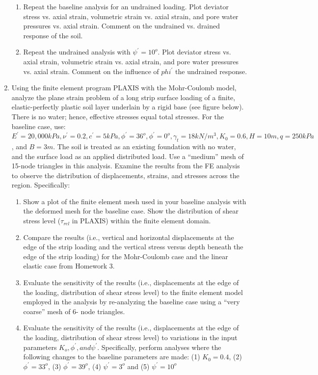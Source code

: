 \documentclass[a4paper,12pt]{article}
\begin{document}
\begin{enumerate}
\begin{enumerate}
		\item Repeat the baseline analysis for an undrained loading. Plot deviator stress vs. axial strain, volumetric strain vs. axial strain, and pore water pressures vs. axial strain. Comment on the undrained vs. drained response of the soil.
		\item Repeat the undrained analysis with $\psi^\prime = 10^o$. Plot deviator stress vs. axial strain,
		volumetric strain vs. axial strain, and pore water pressures vs. axial strain. Comment
		on the influence of $phi^\prime$ the undrained response.
	\end{enumerate}
	
	\item Using the finite element program PLAXIS with the Mohr-Coulomb model, analyze the plane
	strain problem of a long strip surface loading of a finite, elastic-perfectly plastic soil layer
	underlain by a rigid base (see figure below). There is no water; hence, effective stresses
	equal total stresses. For the baseline case, use: $E^\prime = 20,000 kPa, \nu^\prime = 0.2, c^\prime = 5 kPa, \phi^\prime = 36^o, \phi^\prime = 0^o, \gamma_t = 18 kN/m^3, K_0 = 0.6, H = 10m, q = 250 kPa$, and $B = 3 m$.  The soil is treated as an
	existing foundation with no water, and the surface load as an applied distributed load. Use a
	``medium'' mesh of 15-node triangles in this analysis. Examine the results from the FE
	analysis to observe the distribution of displacements, strains, and stresses across the region.	Specifically:
	
	\begin{enumerate}
		\item Show a plot of the finite element mesh used in your baseline analysis with the deformed mesh for the baseline case. Show the
		distribution of shear stress level ($\tau_{rel}$ in PLAXIS) within the finite element domain.
		\item Compare the results (i.e., vertical and horizontal displacements at the edge of the
		strip loading and the vertical stress versus depth beneath the edge of the strip
		loading) for the Mohr-Coulomb case and the linear elastic case from Homework 3.
		\item Evaluate the sensitivity of the results (i.e., displacements at the edge of the
		loading, distribution of shear stress level) to the finite element model employed in
		the analysis by re-analyzing the baseline case using a ``very coarse'' mesh of 6-
		node triangles.
		\item Evaluate the sensitivity of the results (i.e., displacements at the edge of the
		loading, distribution of shear stress level) to variations in the input parameters
		$K_o, \phi^\prime, and \psi^\prime$. Specifically, perform analyses where the following changes to the
		baseline parameters are made: (1) $K_0 = 0.4$, (2) $\phi^\prime = 33^o$, (3) $\phi^\prime = 39^o$, (4) $\psi^\prime = 3^o$ and (5) $\psi^\prime = 10^o$
	\end{enumerate}


\end{enumerate}
\end{document}
